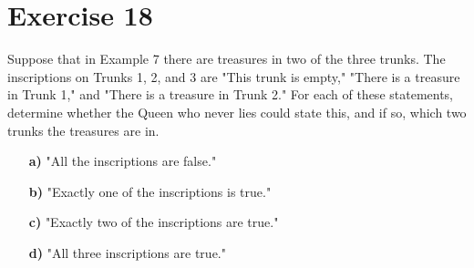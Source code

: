 \documentclass{Axon}
\begin{document}
\section*{Exercise 18}
Suppose that in Example 7 there are treasures in two of the three trunks. The inscriptions on Trunks 1, 2, and 3 are "This trunk is empty," "There is a treasure in Trunk 1," and "There is a treasure in Trunk 2." For each of these statements, determine whether the Queen who never lies could state this, and if so, which two trunks the treasures are in.
\begin{enumerate}
    \item[\textbf{a)}] "All the inscriptions are false."
    \item[\textbf{b)}] "Exactly one of the inscriptions is true."
    \item[\textbf{c)}] "Exactly two of the inscriptions are true."
    \item[\textbf{d)}] "All three inscriptions are true."
\end{enumerate}
\end{document}
